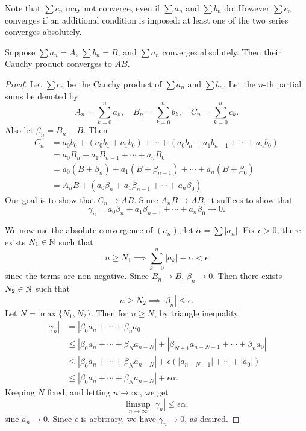 Note that $\sum c_n$ may not converge, even if $\sum a_n$ and $\sum b_n$ do. However $\sum c_n$ converges if an additional condition is imposed: at least one of the two series converges absolutely.

\begin{proposition}
Suppose $\sum a_n=A$, $\sum b_n=B$, and $\sum a_n$ converges absolutely. Then their Cauchy product converges to $AB$.
\end{proposition}

\begin{proof}
Let $\sum c_n$ be the Cauchy product of $\sum a_n$ and $\sum b_n$. Let the $n$-th partial sums be denoted by
\[A_n=\sum_{k=0}^{n}a_k,\quad B_n=\sum_{k=0}^{n}b_k,\quad C_n=\sum_{k=0}^{n}c_k.\]
Also let $\beta_n=B_n-B$. Then 
\begin{align*}
C_n&=a_0b_0+(a_0b_1+a_1b_0)+\cdots+(a_0b_n+a_1b_{n-1}+\cdots+a_nb_0)\\
&=a_0B_n+a_1B_{n-1}+\cdots+a_nB_0\\
&=a_0(B+\beta_n)+a_1(B+\beta_{n-1})+\cdots+a_n(B+\beta_0)\\
&=A_nB+(a_0\beta_n+a_1\beta_{n-1}+\cdots+a_n\beta_0)
\end{align*}
Our goal is to show that $C_n\to AB$. Since $A_nB\to AB$, it suffices to show that
\[\gamma_n=a_0\beta_n+a_1\beta_{n-1}+\cdots+a_n\beta_0\to0.\]

We now use the absolute convergence of $(a_n)$; let $\alpha=\sum|a_n|$. Fix $\epsilon>0$, there exists $N_1\in\mathbb N$ such that
\[n\ge N_1\implies \sum_{k=0}^{n}|a_k|-\alpha<\epsilon\]
since the terms are non-negative. Since $B_n\to B$, $\beta_n\to0$. Then there exists $N_2\in\mathbb N$ such that
\[n\ge N_2\implies|\beta_n|\le\epsilon.\]
Let $N=\max\{N_1,N_2\}$. Then for $n\ge N$, by triangle inequality,
\begin{align*}
|\gamma_n|&=|\beta_0 a_n+\cdots+\beta_n a_0|\\
&\le|\beta_0a_n+\cdots+\beta_Na_{n-N}|+|\beta_{N+1}a_{n-N-1}+\cdots+\beta_na_0|\\
&\le|\beta_0a_n+\cdots+\beta_Na_{n-N}|+\epsilon(|a_{n-N-1}|+\cdots+|a_0|)\\
&\le|\beta_0a_n+\cdots+\beta_Na_{n-N}|+\epsilon\alpha.
\end{align*}
Keeping $N$ fixed, and letting $n\to\infty$, we get
\[\limsup_{n\to\infty}|\gamma_n|\le\epsilon\alpha,\]
sine $a_n\to0$. Since $\epsilon$ is arbitrary, we have $\gamma_n\to0$, as desired.
\end{proof}

